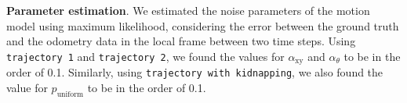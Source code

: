 \documentclass{svmult}
\begin{document}
\label{sec:mle}

\textbf{Parameter estimation}.
We estimated the noise parameters of the motion model using maximum likelihood, considering the error between the ground truth and the odometry data in the local frame between two time steps.
Using \texttt{trajectory~1} and \texttt{trajectory~2}, we found the values for $\alpha_\mathrm{xy}$ and $\alpha_\theta$ to be in the order of 0.1.
Similarly, using \texttt{trajectory with kidnapping}, we also found the value for $p_\mathrm{uniform}$ to be in the order of 0.1.

\end{document}
